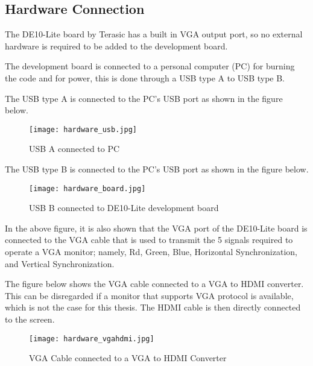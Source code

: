 \subsection{Hardware Connection}
\par The DE10-Lite board by Terasic has a built in VGA output port, so no external hardware is required to be added to the development board.  \newline
\par The development board is connected to a personal computer (PC) for burning the code and for power, this is done through a USB type A to USB type B. \newline
\par The USB type A is connected to the PC's USB port as shown in the figure below. \newline

\begin{figure}[H]
	\centering
	\texttt{[image: hardware\_usb.jpg]}
	\caption{USB A connected to PC}
	\label{fig:hardwarePC}  
\end{figure}

\par The USB type B is connected to the PC's USB port as shown in the figure below. \newline

\begin{figure}[H]
	\centering
	\texttt{[image: hardware\_board.jpg]}
	\caption{USB B connected to DE10-Lite development board}
	\label{fig:hardwareDE}  
\end{figure}

\par In the above figure, it is also shown that the VGA port of the DE10-Lite board is connected to the VGA cable that is used to transmit the 5 signals required to operate a VGA monitor; namely, Rd, Green, Blue, Horizontal Synchronization, and Vertical Synchronization. \newline
\par The figure below shows the VGA cable connected to a VGA to HDMI converter. This can be disregarded if a monitor that supports VGA protocol is available, which is not the case for this thesis. The HDMI cable is then directly connected to the screen. \newline

\begin{figure}[H]
	\centering
	\texttt{[image: hardware\_vgahdmi.jpg]}
	\caption{VGA Cable connected to a VGA to HDMI Converter}
	\label{fig:hardwareVGAHDMI}  
\end{figure}

